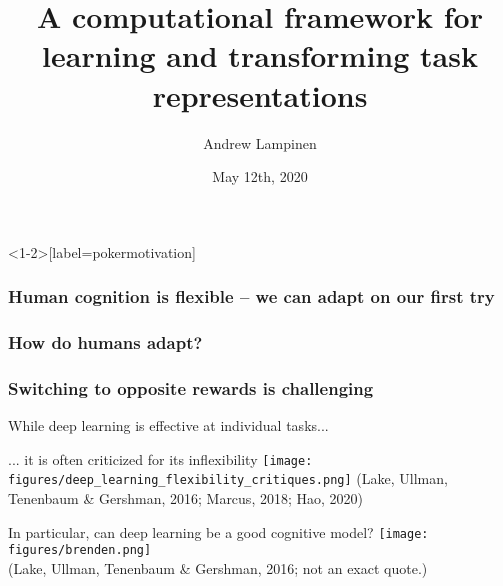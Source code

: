 \documentclass{beamer}
\begin{document}
\title{A computational framework for learning and transforming task representations}
\author{Andrew Lampinen}
\date{May 12th, 2020}
\frame{\titlepage}


\begin{frame}<1-2>[label=pokermotivation]
\frametitle<1-2>{Human cognition is flexible -- we can adapt on our first try}
\frametitle<3-4>{How do humans adapt?}
\frametitle<5>{Switching to opposite rewards is challenging}
\centering
{}
\end{frame}

\begin{frame}{While deep learning is effective at individual tasks...}
\centering
{}
\end{frame}

\begin{frame}{... it is often criticized for its inflexibility}
\texttt{[image: figures/deep\_learning\_flexibility\_critiques.png]}
{\scriptsize (Lake, Ullman, Tenenbaum \& Gershman, 2016; Marcus, 2018; Hao, 2020)}
\end{frame}

\begin{frame}{In particular, can deep learning be a good cognitive model?}
\phantom{}
{
\centering
\texttt{[image: figures/brenden.png]}\\
}
{\scriptsize (Lake, Ullman, Tenenbaum \& Gershman, 2016; not an exact quote.)}
\end{frame}
\end{document}
